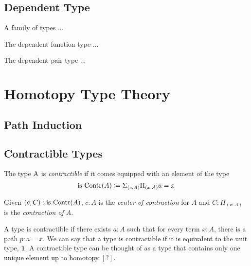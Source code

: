 \documentclass{article}
\begin{document}
\subsection{Dependent Type}

\begin{definition}
  A family of types ...
\end{definition}

\begin{definition}
  The dependent function type ...
\end{definition}

\begin{definition}
  The dependent pair type ...
\end{definition}

\section{Homotopy Type Theory}


\subsection{Path Induction}

\subsection{Contractible Types}

\begin{definition}
  The type $\operatorname{A}$ is \emph{contractible} if it comes equipped with an element of the type
  \begin{equation*}
    \is-Contr(A) \coloneq \Sigma_{(c : A)}\Pi_{(x : A)} a = x
  \end{equation*}

  Given $(c, C) : \is-Contr(A)$, $c : A$ is the \emph{center of contraction} for $A$ and $C : \Pi_{(x : A)}$ is the \emph{contraction of $A$}.
\end{definition}
\begin{remark}[Intuition]
  A type is contractible if there exists $a : A$ such that for every term $x : A$, there is a path $p : a = x$. We can say that a type is contractible if it is equivalent to the unit type, $\mathbf{1}$. A contractible type can be thought of as a type that contains only one unique element up to homotopy $\mathbf{[?]}$.
\end{remark}
\end{document}
